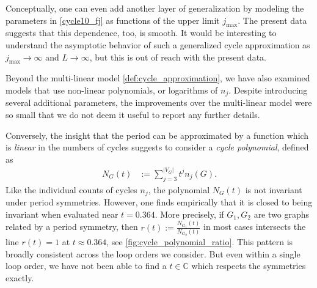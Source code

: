 \documentclass[12pt]{article}
\numberwithin{equation}{section}
\newcommand{\abs}[1]{\lvert #1 \rvert}
\begin{document}
Conceptually, one can even add another layer of generalization by modeling the parameters in \cref{cycle10_fj} as functions of the upper limit $j_\text{max}$. The present data suggests that this dependence, too, is smooth. It would be interesting to understand the asymptotic behavior of such a generalized cycle approximation as $j_\text{max}\rightarrow \infty$ and $L\rightarrow\infty$, but this is out of reach with the present data. 


Beyond the multi-linear model \cref{def:cycle_approximation}, we have also examined models that use non-linear polynomials, or logarithms of $n_j$. Despite introducing several additional parameters, the improvements over the multi-linear model were so small that we do not deem it useful to report any further details.

Conversely, the insight that the period can be approximated by a function which is \emph{linear} in the numbers of cycles  suggests to consider a \emph{cycle polynomial}, defined as
\begin{align}\label{def:cycle_polynomial}
	N_G(t) &:= \sum_{j=3}^{\abs{V_G}} t^j n_j (G) .
\end{align}
Like the individual counts of cycles $n_j$, the polynomial $N_G (t)$ is not invariant under period symmetries. However, one finds empirically that it is closed to being invariant when evaluated near $t= 0.364$. More precisely, if $G_1,G_2$ are two graphs related by a period symmetry, then $r(t):=\frac{N_{G_1}(t)}{N_{G_2}(t)}$ in most cases intersects the line $r(t)=1$ at $t\approx 0.364$, see \cref{fig:cycle_polynomial_ratio}. This pattern is broadly consistent across the loop orders we consider. But even within a single loop order, we have not been able to find a $t\in \mathbb C$ which  respects the symmetries exactly. 
\end{document}
